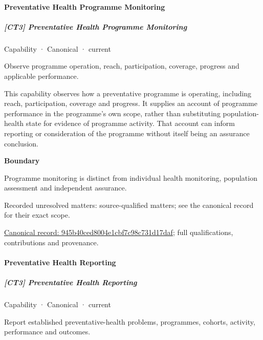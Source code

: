 \paragraph{Preventative Health Programme Monitoring}

\subparagraph{[CT3] Preventative Health Programme Monitoring}

\label{element:945b40ced8004e1cbf7c98c731d17daf}
{\small Capability · Canonical · current}\par

Observe programme operation, reach, participation, coverage, progress and applicable performance.



This capability observes how a preventative programme is operating, including reach, participation, coverage and progress. It supplies an account of programme performance in the programme's own scope, rather than substituting population-health state for evidence of programme activity. That account can inform reporting or consideration of the programme without itself being an assurance conclusion.



\textbf{Boundary}



Programme monitoring is distinct from individual health monitoring, population assessment and independent assurance.


{\small Recorded unresolved matters: source-qualified matters; see the canonical record for their exact scope.}\par
{\footnotesize \href{../../../../continuum/strategy/capability/945b40ced8004e1cbf7c98c731d17daf.md}{Canonical record: 945b40ced8004e1cbf7c98c731d17daf}; full qualifications, contributions and provenance.}\par
\paragraph{Preventative Health Reporting}

\subparagraph{[CT3] Preventative Health Reporting}

\label{element:d2ef01c4cab348df822e802ab084faae}
{\small Capability · Canonical · current}\par

Report established preventative-health problems, programmes, cohorts, activity, performance and outcomes.



